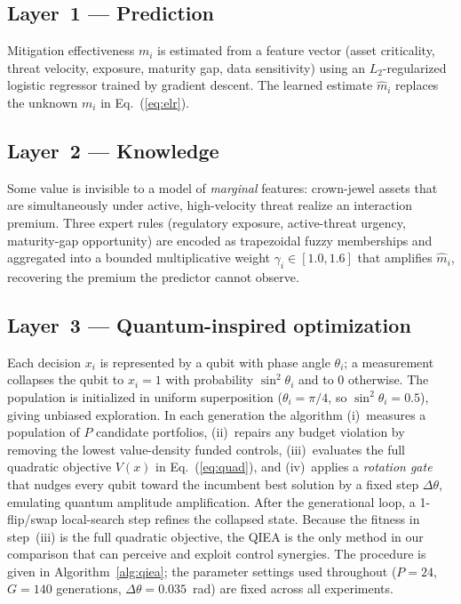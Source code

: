\documentclass[preprint,12pt]{elsarticle}
\begin{document}
\subsection{Layer~1 --- Prediction}
\label{sec:pred}
Mitigation effectiveness $m_i$ is estimated from a feature vector (asset criticality,
threat velocity, exposure, maturity gap, data sensitivity) using an $L_2$-regularized
logistic regressor trained by gradient descent. The learned estimate $\hat{m}_i$
replaces the unknown $m_i$ in Eq.~(\ref{eq:elr}).

\subsection{Layer~2 --- Knowledge}
\label{sec:know}
Some value is invisible to a model of \emph{marginal} features: crown-jewel assets that
are simultaneously under active, high-velocity threat realize an interaction premium.
Three expert rules (regulatory exposure, active-threat urgency, maturity-gap
opportunity) are encoded as trapezoidal fuzzy memberships and aggregated into a bounded
multiplicative weight $\gamma_i \in [1.0, 1.6]$ that amplifies $\hat{m}_i$, recovering
the premium the predictor cannot observe.

\subsection{Layer~3 --- Quantum-inspired optimization}
\label{sec:qiea}
Each decision $x_i$ is represented by a qubit with phase angle $\theta_i$; a measurement
collapses the qubit to $x_i = 1$ with probability $\sin^2\theta_i$ and to 0 otherwise.
The population is initialized in uniform superposition ($\theta_i = \pi/4$, so
$\sin^2\theta_i = 0.5$), giving unbiased exploration. In each generation the algorithm
(i)~measures a population of $P$ candidate portfolios, (ii)~repairs any budget violation
by removing the lowest value-density funded controls, (iii)~evaluates the full quadratic
objective $V(x)$ in Eq.~(\ref{eq:quad}), and (iv)~applies a \emph{rotation gate} that
nudges every qubit toward the incumbent best solution by a fixed step $\Delta\theta$,
emulating quantum amplitude amplification. After the generational loop, a 1-flip/swap
local-search step refines the collapsed state. Because the fitness in step~(iii) is the
full quadratic objective, the QIEA is the only method in our comparison that can
perceive and exploit control synergies. The procedure is given in
Algorithm~\ref{alg:qiea}; the parameter settings used throughout ($P = 24$, $G = 140$
generations, $\Delta\theta = 0.035$~rad) are fixed across all experiments.
\end{document}
